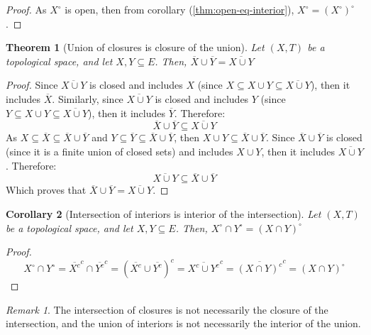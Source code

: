 \documentclass{article}
\newtheorem{theorem}{Theorem}[section]
\newtheorem{corollary}[theorem]{Corollary}
\theoremstyle{definition}
\theoremstyle{remark}
\newtheorem*{remark}{Remark}
\theoremstyle{example}
\theoremstyle{notation}
\newcommand{\inter}[1]{{{#1}^\circ}}
\begin{document}
\begin{proof}
		As $\inter{X}$ is open, then from corollary (\ref{thm:open-eq-interior}), $\inter{X} = \inter{(\inter{X})}$.
\end{proof}

\begin{theorem}[Union of closures is closure of the union]
		Let $(X, T)$ be a topological space, and let $X, Y \subseteq E$. Then, $\overline{X} \cup \overline{Y} = \overline{X \cup Y}$
\end{theorem}

\begin{proof}
		Since $\overline{X \cup Y}$ is closed and includes $X$ (since $X \subseteq X \cup Y \subseteq \overline{X \cup Y}$), then it includes $\overline{X}$. Similarly, since $\overline{X \cup Y}$ is closed and includes $Y$ (since $Y \subseteq X \cup Y \subseteq \overline{X \cup Y}$), then it includes $\overline{Y}$. Therefore:
				$$\overline{X} \cup \overline{Y} \subseteq \overline{X \cup Y}$$
		As $X \subseteq \overline{X} \subseteq \overline{X} \cup \overline{Y}$ and $Y \subseteq \overline{Y} \subseteq \overline{X} \cup \overline{Y}$, then $X \cup Y \subseteq \overline{X} \cup \overline{Y}$. Since $\overline{X} \cup \overline{Y}$ is closed (since it is a finite union of closed sets) and includes $X \cup Y$, then it includes $\overline{X \cup Y}$. Therefore:
				$$\overline{X \cup Y} \subseteq \overline{X} \cup \overline{Y}$$
		Which proves that $\overline{X} \cup \overline{Y} = \overline{X \cup Y}$.
\end{proof}

\begin{corollary}[Intersection of interiors is interior of the intersection]
		Let $(X, T)$ be a topological space, and let $X, Y \subseteq E$. Then, $\inter{X} \cap \inter{Y} = \inter{(X \cap Y)}$
\end{corollary}

\begin{proof}
		$$\inter{X} \cap \inter{Y} = \overline{X^c}^c \cap \overline{Y^c}^c = (\overline{X^c} \cup \overline{Y^c})^c = \overline{X^c \cup Y^c}^c = \overline{(X \cap Y)^c}^c = \inter{(X \cap Y)}$$
\end{proof}

\begin{remark}
		The intersection of closures is not necessarily the closure of the intersection, and the union of interiors is not necessarily the interior of the union.
\end{remark}
\end{document}
